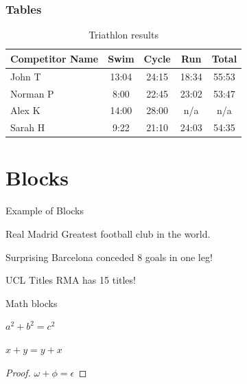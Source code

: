 \documentclass{beamer}
\begin{document}
\begin{frame}
    \frametitle{Tables}
    \begin{table}
    \begin{tabular}{l | c | c | c | c }
    Competitor Name & Swim & Cycle & Run & Total \\
    \hline \hline
    John T & 13:04 & 24:15 & 18:34 & 55:53 \\ 
     Norman P & 8:00 & 22:45 & 23:02 & 53:47 \\
     Alex K & 14:00 & 28:00 & n/a & n/a \\
     Sarah H & 9:22 & 21:10 & 24:03 & 54:35
    \end{tabular}
    \caption{Triathlon results}
    \end{table}
\end{frame}

\section{Blocks}

\begin{frame}{Example of Blocks}

\begin{block}{Real Madrid}
    Greatest football club in the world. 
\end{block}

\begin{alertblock}{Surprising}
    Barcelona conceded 8 goals in one leg! 
\end{alertblock}

\begin{exampleblock}{UCL Titles}
    RMA has 15 titles!
\end{exampleblock}
    
\end{frame}

\begin{frame}{
    Math blocks
}
    \begin{theorem}[Pythagoras] 
    $ a^2 + b^2 = c^2$
    \end{theorem} \pause 
    \begin{corollary}
    $ x + y = y + x  $
    \end{corollary} \pause 
    \begin{proof}
    $\omega +\phi = \epsilon $
    \end{proof}    
\end{frame}
\end{document}
